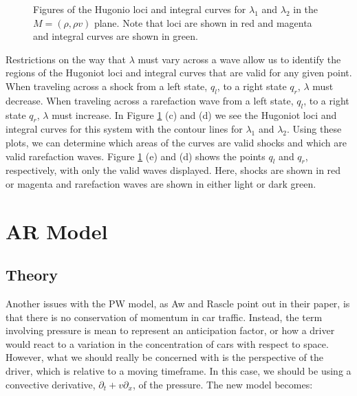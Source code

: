 \documentclass{article}
\begin{document}
\begin{figure}[h!]
{   }
 \caption[Optional caption for list of figures]
 {Figures of the Hugonio loci and integral curves for $\lambda_1$ and $\lambda_2$ in the $M = (\rho, \rho v)$ plane. Note that loci are shown in red and magenta and integral curves are shown in green.}
  \label{fig:PW_curves}
\end{figure}

Restrictions on the way that $\lambda$ must vary across a wave allow us to identify the regions of the Hugoniot loci and integral curves that are valid for any given point. When traveling across a shock from a left state, $q_l$, to a right state $q_r$, $\lambda$ must decrease. When traveling across a rarefaction wave from a left state, $q_l$, to a right state $q_r$, $\lambda$ must increase. In Figure \ref{fig:PW_curves} (c) and (d) we see the Hugoniot loci and integral curves for this system with the contour lines for $\lambda_1$ and $\lambda_2$. Using these plots, we can determine which areas of the curves are valid shocks and which are valid rarefaction waves. Figure \ref{fig:PW_curves} (e) and (d) shows the points $q_l$ and $q_r$, respectively, with only the valid waves displayed. Here, shocks are shown in red or magenta and rarefaction waves are shown in either light or dark green.

\section{AR Model}

\subsection{Theory}
Another issues with the PW model, as Aw and Rascle point out in their paper, is that there is no conservation of momentum in car traffic.  Instead, the term involving pressure is mean to represent an anticipation factor, or how a driver would react to a variation in the concentration of cars with respect to space.   However, what we should really be concerned with is the perspective of the driver, which is relative to a moving timeframe.  In this case, we should be using a convective derivative, $\partial_t + v \partial_x$, of the pressure.  The new model becomes:
\end{document}
